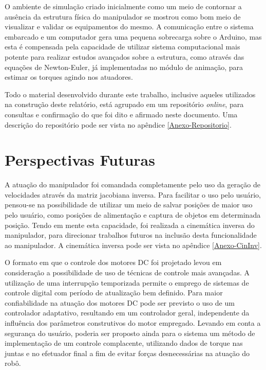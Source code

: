 O ambiente de simulação criado inicialmente como um meio de contornar a ausência da estrutura física do
manipulador se mostrou como bom meio de visualizar e validar os equipamentos do mesmo. A comunicação
entre o sistema embarcado e um computador gera uma pequena sobrecarga sobre o Arduino, mas esta é compensada pela capacidade
de utilizar sistema computacional mais potente para realizar estudos avançados sobre a estrutura,
como através das equações de Newton-Euler, já implementadas no módulo de animação, para estimar os torques agindo nos
atuadores.

Todo o material desenvolvido durante este trabalho, inclusive aqueles utilizados na construção deste 
relatório, está agrupado em um repositório \textit{online}, para consultas e confirmação do que foi 
dito e afirmado neste documento. Uma descrição do repositório pode ser vista no apêndice \ref{Anexo-Repositorio}.

\section{Perspectivas Futuras}

A atuação do manipulador foi comandada completamente pelo uso da geração de velocidades através da matriz
jacobiana inversa. Para facilitar o uso pelo usuário, pensou-se na possibilidade de utilizar um meio de 
salvar posições de maior uso pelo usuário, como posições de alimentação e captura de objetos em determinada 
posição. Tendo em mente esta capacidade, foi realizada a cinemática inversa do manipulador, para direcionar
trabalhos futuros na inclusão desta funcionalidade ao manipulador. A cinemática inversa pode ser vista no apêndice
\ref{Anexo-CinInv}.

O formato em que o controle dos motores DC foi projetado levou em consideração a possibilidade de uso de técnicas 
de controle mais avançadas. A utilização de uma interrupção temporizada permite o emprego de sistemas de controle
digital com período de atualização bem definido. Para maior confiabilidade na atuação dos motores DC pode ser 
previsto o uso de um controlador adaptativo, resultando em um controlador geral, independente da influência dos 
parâmetros construtivos do motor empregado. Levando em conta a segurança do usuário, poderia ser proposto ainda 
para o sistema um método de implementação de um controle complacente, utilizando dados de torque nas juntas e no
efetuador final a fim de evitar forças desnecessárias na atuação do robô.

